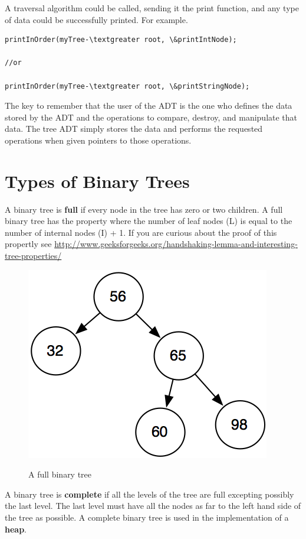A traversal algorithm could be called, sending it the print function,
and any type of data could be successfully printed. For example.
\begin{lstlisting}
printInOrder(myTree-\textgreater root, \&printIntNode);

//or

printInOrder(myTree-\textgreater root, \&printStringNode);
\end{lstlisting}

The key to remember that the user of
the ADT is the one who defines the data stored by the ADT and the
operations to compare, destroy, and manipulate that data. The tree ADT
simply stores the data and performs the requested operations when given
pointers to those operations.


\section{Types of Binary Trees}

A binary tree is \textbf{full} if every node in the tree has zero or two children.     A full binary tree has the property where the number of leaf nodes (L) is equal to the number of internal nodes (I) + 1.    If you are curious about the proof of this propertly see
 \url{http://www.geeksforgeeks.org/handshaking-lemma-and-interesting-tree-properties/}
  \begin{figure}[H]
\centering
\includegraphics{pictures/fullTree.png}
\label{fig:fullTree}
\caption{A full binary tree}
\end{figure}

A binary tree is \textbf{complete} if all the levels of the tree are full excepting possibly the last level.   The last level must have all the nodes as far to the left hand side of the tree as possible.    A complete binary tree is used in the implementation of a \textbf{heap}.


